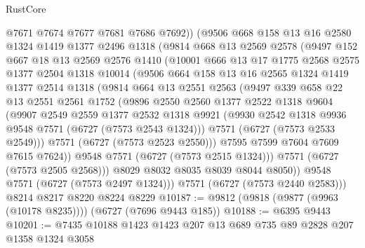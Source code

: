 \begin{lexlean}{RustCore}
\begin{coremodule}
          @7671
          @7674
          @7677
          @7681
          @7686
          @7692))
      (@9506
        @668
        @158
        @13
        @16
        @2580
        @1324
        @1419
        @1377
        @2496
        @1318
        (@9814
          @668
          @13
          @2569
          @2578
          (@9497
            @152
            @667
            @18
            @13
            @2569
            @2576
            @1410
            (@10001
              @666
              @13
              @17
              @1775
              @2568
              @2575
              @1377
              @2504
              @1318
              @10014
              (@9506
                @664
                @158
                @13
                @16
                @2565
                @1324
                @1419
                @1377
                @2514
                @1318
                (@9814
                  @664
                  @13
                  @2551
                  @2563
                  (@9497
                    @339
                    @658
                    @22
                    @13
                    @2551
                    @2561
                    @1752
                    (@9896
                      @2550
                      @2560
                      @1377
                      @2522
                      @1318
                      @9604
                      (@9907
                        @2549
                        @2559
                        @1377
                        @2532
                        @1318
                        @9921
                        (@9930 @2542 @1318 @9936 @9548 @7571 (@6727 (@7573 @2543 @1324)))
                        @7571
                        (@6727 (@7573 @2533 @2549)))
                      @7571
                      (@6727 (@7573 @2523 @2550)))
                    @7595
                    @7599
                    @7604
                    @7609
                    @7615
                    @7624))
                @9548
                @7571
                (@6727 (@7573 @2515 @1324)))
              @7571
              (@6727 (@7573 @2505 @2568)))
            @8029
            @8032
            @8035
            @8039
            @8044
            @8050))
        @9548
        @7571
        (@6727 (@7573 @2497 @1324)))
      @7571
      (@6727 (@7573 @2440 @2583)))
    @8214
    @8217
    @8220
    @8224
    @8229
@10187 := @9812 (@9818 (@9877 (@9963 (@10178 @8235)))) (@6727 (@7696 @9443 @185))
@10188 := @6395 @9443
@10201 := @7435 @10188 @1423 @1423 @207 @13 @689 @735 @89 @2828 @207 @1358 @1324 @3058

\end{coremodule}
\end{lexlean}
